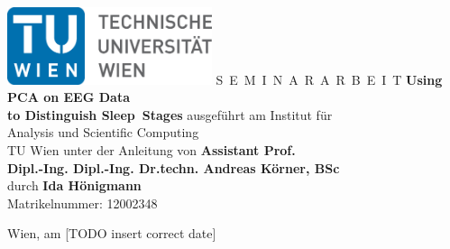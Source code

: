 \documentclass[a4paper,11pt,bibliography=totoc,listof=totoc,headinclude=true,cleardoublepage=empty,oneside]{scrbook}
\begin{document}


\begin{titlepage}
  \begin{center}
    \includegraphics[width=0.45\textwidth]{TULogo.eps}
    \vskip 1cm%
    {\LARGE S~\Large E~M~I~N~A~R~A~R~B~E~I~T}
    \vskip 8mm
    {\huge\bfseries\color{change}Using PCA on EEG Data \\[1ex] to Distinguish Sleep~Stages}
    \vskip 1cm
    \large 
    ausgef\"uhrt am    
    \vskip 0.75cm
    {\Large Institut f\"ur\\[1ex] Analysis und Scientific Computing}\\[1ex]
    {\Large TU Wien}
    \vskip0.75cm
    unter der Anleitung von
    \vskip0.75cm
    {\Large\bfseries\color{change}Assistant Prof. \\[1ex] Dipl.-Ing. Dipl.-Ing. Dr.techn. Andreas Körner, BSc}\\[1ex]
    \vskip 0.5cm
    durch
    \vskip 0.5cm
    {\Large\bfseries\color{change}Ida Hönigmann}\\[1ex]
    Matrikelnummer: {\color{change}12002348}
  \end{center}
  
  \vfill
  
  \small
  Wien, am {\color{change} [TODO insert correct date]}
  \vspace*{-15mm}
\end{titlepage}

\cleardoublepage



\tableofcontents

\cleardoublepage
{} 












 
%

\end{document}
